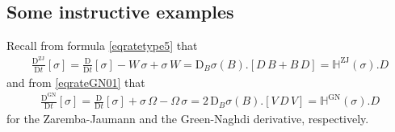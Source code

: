 \documentclass[10pt]{article}
\numberwithin{theoremCounter}{section}
\theoremstyle{plain}
\theoremstyle{definition}
\newcommand{\DD}{\mathrm{D}}
\DeclareMathOperator{\ZJ}{ZJ}
\DeclareMathOperator{\GN}{GN}
\def\H{\mathbb{H}}
\numberwithin{equation}{section}
\begin{document}
\subsection{Some instructive examples}
%
Recall from formula \eqref{eqratetype5} that
	\begin{align}
	\frac{\DD^{\ZJ}}{\DD t}[\sigma] = \frac{\DD}{\DD t}[\sigma] - W \, \sigma + \sigma \, W = \DD_B\sigma(B).[D \, B + B \, D] = \H^{\ZJ}(\sigma).D
	\end{align}
and from \eqref{eqrateGN01} that
	\begin{align}
	\frac{\DD^{\GN}}{\DD t}[\sigma] = \frac{\DD}{\DD t}[\sigma] + \sigma \, \Omega - \Omega \, \sigma = 2 \, \DD_B\sigma(B).[V \, D \, V] = \H^{\GN}(\sigma).D
	\end{align}
for the Zaremba-Jaumann and the Green-Naghdi derivative, respectively.
%
\end{document}
